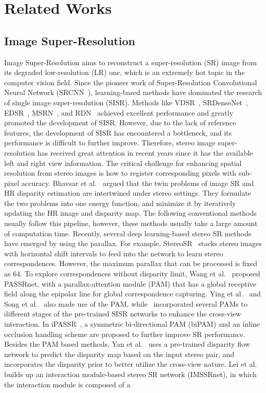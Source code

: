 \documentclass[sigconf]{acmart}
\begin{document}
\section{Related Works}
\subsection{Image Super-Resolution}
Image Super-Resolution aims to reconstruct a super-resolution (SR) image from its degraded low-resolution (LR) one, which is an extremely hot topic in the computer vision field. Since the pioneer work of Super-Resolution Convolutional Neural Network (SRCNN~\cite{Dong2014LearningAD}), learning-based methods have dominated the research of single image super-resolution (SISR). Methods like VDSR~\cite{Kim2016AccurateIS}, SRDenseNet~\cite{Tong2017ImageSU}, EDSR~\cite{Lim2017EnhancedDR}, MSRN~\cite{Li2018MultiscaleRN}, and RDN~\cite{Zhang2018ResidualDN} achieved excellent performance and greatly promoted the development of SISR. However, due to the lack of reference features, the development of SISR has encountered a bottleneck, and its performance is difficult to further improve. Therefore, stereo image super-resolution has received great attention in recent years since it has the available left and right view information. The critical challenge for enhancing spatial resolution from stereo images is how to register corresponding pixels with sub-pixel accuracy. Bhavsar et al.~\cite{Bhavsar2010ResolutionEI} argued that the twin problems of image SR and HR disparity estimation are intertwined under stereo settings. They formulate the two problems into one energy function, and minimize it by iteratively updating the HR image and disparity map. The following conventional methods~\cite{Park2012CombiningMS, Lee2013SimultaneousSO} usually follow this pipeline, however, these methods usually take a large amount of computation time. Recently, several deep learning-based stereo SR methods have emerged by using the parallax. For example, StereoSR~\cite{Jeon2018EnhancingTS} stacks stereo images with horizontal shift intervals to feed into the network to learn stereo correspondences. However, the maximum parallax that can be processed is fixed as 64. To explore correspondences without disparity limit, Wang et al.~\cite{Wang2019LearningPA, Wang2020ParallaxAF} proposed PASSRnet, with a parallax-attention module (PAM) that has a global receptive field along the epipolar line for global correspondence capturing. Ying et al.~\cite{Ying2020ASA} and Song et al.~\cite{Song2020StereoscopicIS} also made use of the PAM, while~\cite{Ying2020ASA} incorporated several PAMs to different stages of the pre-trained SISR networks to enhance the cross-view interaction. In iPASSR~\cite{Wang2020SymmetricPA}, a symmetric bi-directional PAM (biPAM) and an inline occlusion handling scheme are proposed to further improve SR performance. Besides the PAM based methods, Yan et al.~\cite{Yan2020DisparityAwareDA} uses a pre-trained disparity flow network to predict the disparity map based on the input stereo pair, and incorporates the disparity prior to better utilize the cross-view nature. Lei et al.~\cite{Lei2020DeepSI} builds up an interaction module-based stereo SR network (IMSSRnet), in which the interaction module is composed of a 
\end{document}
